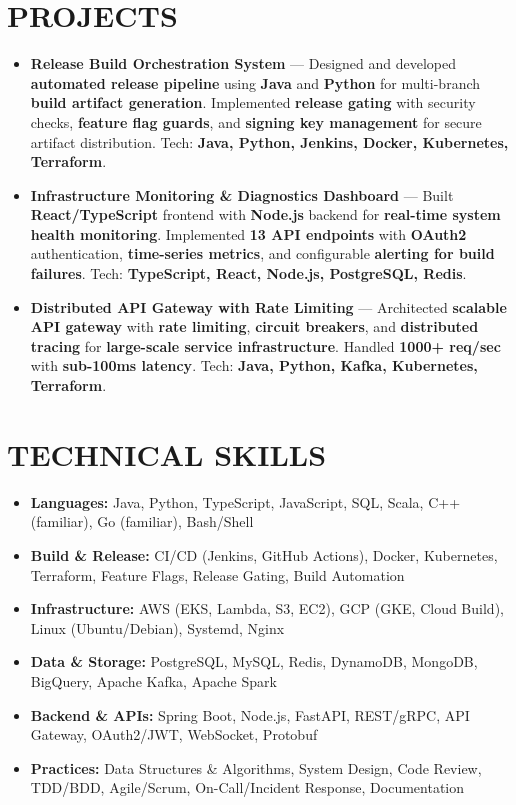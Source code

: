\documentclass[letterpaper,10pt]{article}
\newcommand{\resumeItem}[1]{\item\small #1}
\begin{document}
\section{\textcolor{metablue}{PROJECTS}}
\vspace{-5pt}
\begin{tcolorbox}[colback=white,colframe=metablue,boxrule=0.8pt,arc=2pt,left=4pt,right=4pt,top=2pt,bottom=2pt]
\begin{itemize}
\resumeItem{\textbf{Release Build Orchestration System} --- Designed and developed \textbf{automated release pipeline} using \textbf{Java} and \textbf{Python} for multi-branch \textbf{build artifact generation}. Implemented \textbf{release gating} with security checks, \textbf{feature flag guards}, and \textbf{signing key management} for secure artifact distribution. Tech: \textbf{Java, Python, Jenkins, Docker, Kubernetes, Terraform}.}
\resumeItem{\textbf{Infrastructure Monitoring \& Diagnostics Dashboard} --- Built \textbf{React/TypeScript} frontend with \textbf{Node.js} backend for \textbf{real-time system health monitoring}. Implemented \textbf{13 API endpoints} with \textbf{OAuth2} authentication, \textbf{time-series metrics}, and configurable \textbf{alerting for build failures}. Tech: \textbf{TypeScript, React, Node.js, PostgreSQL, Redis}.}
\resumeItem{\textbf{Distributed API Gateway with Rate Limiting} --- Architected \textbf{scalable API gateway} with \textbf{rate limiting}, \textbf{circuit breakers}, and \textbf{distributed tracing} for \textbf{large-scale service infrastructure}. Handled \textbf{1000+ req/sec} with \textbf{sub-100ms latency}. Tech: \textbf{Java, Python, Kafka, Kubernetes, Terraform}.}
\end{itemize}
\end{tcolorbox}
\vspace{-5pt}


\section{\textcolor{metablue}{TECHNICAL SKILLS}}
\vspace{-5pt}
\small
\begin{itemize}
\resumeItem{\textbf{Languages:} Java, Python, TypeScript, JavaScript, SQL, Scala, C++ (familiar), Go (familiar), Bash/Shell}
\resumeItem{\textbf{Build \& Release:} CI/CD (Jenkins, GitHub Actions), Docker, Kubernetes, Terraform, Feature Flags, Release Gating, Build Automation}
\resumeItem{\textbf{Infrastructure:} AWS (EKS, Lambda, S3, EC2), GCP (GKE, Cloud Build), Linux (Ubuntu/Debian), Systemd, Nginx}
\resumeItem{\textbf{Data \& Storage:} PostgreSQL, MySQL, Redis, DynamoDB, MongoDB, BigQuery, Apache Kafka, Apache Spark}
\resumeItem{\textbf{Backend \& APIs:} Spring Boot, Node.js, FastAPI, REST/gRPC, API Gateway, OAuth2/JWT, WebSocket, Protobuf}
\resumeItem{\textbf{Practices:} Data Structures \& Algorithms, System Design, Code Review, TDD/BDD, Agile/Scrum, On-Call/Incident Response, Documentation}
\end{itemize}
\vspace{-10pt}
\end{document}
